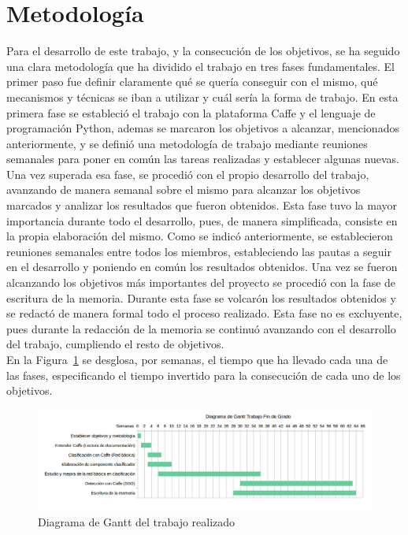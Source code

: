 \section{Metodología}

Para el desarrollo de este trabajo, y la consecución de los objetivos, se ha seguido una clara metodología que ha dividido el trabajo en tres fases fundamentales. El primer paso fue definir claramente qué se quería conseguir con el mismo, qué mecanismos y técnicas se iban a utilizar y cuál sería la forma de trabajo. En esta primera fase se estableció el trabajo con la plataforma Caffe y el lenguaje de programación Python, ademas se marcaron los objetivos a alcanzar, mencionados anteriormente, y se definió una metodología de trabajo mediante reuniones semanales para poner en común las tareas realizadas y establecer algunas nuevas. Una vez superada esa fase, se procedió con el propio desarrollo del trabajo, avanzando de manera semanal sobre el mismo para alcanzar los objetivos marcados y analizar los resultados que fueron obtenidos. Esta fase tuvo la mayor importancia durante todo el desarrollo, pues, de manera simplificada, consiste en la propia elaboración del mismo. Como se indicó anteriormente, se establecieron reuniones semanales entre todos los miembros, estableciendo las pautas a seguir en el desarrollo y poniendo en común los resultados obtenidos. Una vez se fueron alcanzando los objetivos más importantes del proyecto se procedió con la fase de escritura de la memoria. Durante esta fase se volcarón los resultados obtenidos y se redactó de manera formal todo el proceso realizado. Esta fase no es excluyente, pues durante la redacción de la memoria se continuó avanzando con el desarrollo del trabajo, cumpliendo el resto de objetivos.\\

En la Figura~\ref{fig.diagrama} se desglosa, por semanas, el tiempo que ha llevado cada una de las fases, especificando el tiempo invertido para la consecución de cada uno de los objetivos.

\begin{figure}[H]
	\begin{center}
		\includegraphics[width=1\textwidth]{figures/diagrama}
		\caption{Diagrama de Gantt del trabajo realizado}
		\label{fig.diagrama}
	\end{center}
\end{figure}

